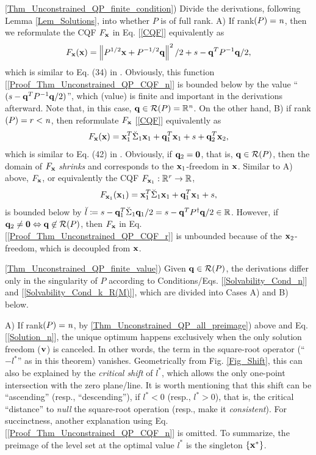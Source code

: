\documentclass[9pt,twocolumn,twoside,lineno]{pnas-new-1}
\newcommand{\beq}{\begin{eqnarray}}
\newcommand{\eeq}{\end{eqnarray}}
\newcommand{\bfx}{{\bf x}}
\newcommand{\bfq}{{\bf q}}
\newcommand{\bfv}{{\bf v}}
\newcommand{\bfzero}{{\bf 0}}
\newcommand{\real}{\mathbb{R}}
\newcommand{\calR}{{\mathcal R}}
\newcommand{\itn}{{\it n}}
\newcommand{\itr}{{\it r}}
\theoremstyle{remark}
\begin{document}
\noindent\ref{Thm_Unconstrained_QP_finite_condition}) Divide the derivations, following Lemma \ref{Lem_Solutions}, into whether $P$ is of full rank. A) If rank$(P)=\itn$, then we reformulate the CQF $F_\bfx$ in Eq. [\ref{CQF}] equivalently as
\beq
F_\bfx(\bfx)=\left\Vert P^{1/2}\bfx+P^{-{1/2}}\bfq\right\Vert^2/2+s-\bfq^TP^{-1}\bfq/2,
\label{Proof_Thm_Unconstrained_QP_CQF_n}
\eeq
which is similar to Eq. (34) in \cite{LiLiHs:20}. Obviously, this function [\ref{Proof_Thm_Unconstrained_QP_CQF_n}] is bounded below by the value ``$(s-\bfq^TP^{-1}\bfq/2)$'', which (value) is finite and important in the derivations afterward. Note that, in this case, $\bfq\in \calR(P)=\real^\itn$. On the other hand, B) if rank$(P)=r<\itn$, then reformulate $F_\bfx$ [\ref{CQF}] equivalently as
\beq
F_\bfx(\bfx)=\bfx_1^T\breve\Sigma_1\bfx_1+\bfq_1^T\bfx_1+s+\bfq_2^T\bfx_2,
\label{Proof_Thm_Unconstrained_QP_CQF_r}
\eeq
which is similar to Eq. (42) in \cite{LiLiHs:20}. Obviously, if $\bfq_2=\bfzero$, that is, $\bfq\in\calR(P)$, then the domain of $F_\bfx$ \textit{shrinks} and corresponds to the $\bfx_1$-freedom in $\bfx$. Similar to A) above, $F_\bfx$, or equivalently the CQF $F_{\bfx_1}:\real^\itr\rightarrow\real$,
\beq
F_{\bfx_1}(\bfx_1)=\bfx_1^T\breve\Sigma_1\bfx_1+\bfq_1^T\bfx_1+s,
\label{Proof_Thm_Unconstrained_QP_CQF_r_x1}
\eeq
is bounded below by $\breve l\coloneqq s-\bfq_1^T\breve\Sigma_1\bfq_1/2=s-\bfq^T P^\dagger\bfq/2\in\real$. However, if $\bfq_2\ne\bfzero\Leftrightarrow \bfq\not\in\calR(P)$, then $F_\bfx$ in Eq. [\ref{Proof_Thm_Unconstrained_QP_CQF_r}] is unbounded because of the $\bfx_2$-freedom, which is decoupled from $\bfx$.\vspace{0.16cm}

\noindent\ref{Thm_Unconstrained_QP_finite_value}) Given $\bfq\in \calR(P)$, the derivations differ only in the singularity of $P$ according to Conditions/Eqs. [\ref{Solvability_Cond_n}] and [\ref{Solvability_Cond_k_R(M)}], which are divided into Cases A) and B) below.\vspace{0.16cm}

\noindent A) If rank$(P)=\itn$, by \ref{Thm_Unconstrained_QP_all_preimage}) above and Eq. [\ref{Solution_n}], the unique optimum happens exclusively when the only solution freedom ($\bfv$) is canceled. In other words, the term in the square-root operator (``$-l^*$'' as in this theorem) vanishes. Geometrically from Fig. \ref{Fig_Shift}, this can also be explained by the \textit{critical shift} of $l^*$, which allows the only one-point intersection with the zero plane/line. It is worth mentioning that this shift can be ``ascending'' (resp., ``descending''), if $l^*<0$ (resp., $l^*>0$), that is, the critical ``distance'' to \textit{null} the square-root operation (resp., make it \textit{consistent}). For succinctness, another explanation using Eq. [\ref{Proof_Thm_Unconstrained_QP_CQF_n}] is omitted. To summarize, the preimage of the level set at the optimal value $l^*$ is the singleton $\{\bfx^*\}$.\vspace{0.16cm}
\end{document}
